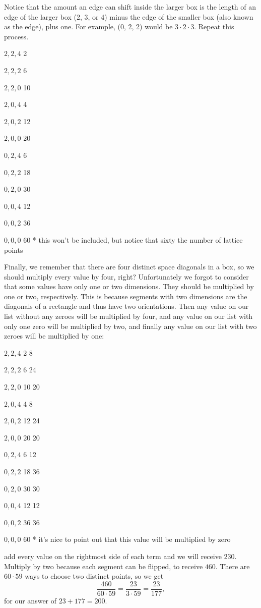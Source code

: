 \begin{enumerate}
 Notice that the amount an edge can shift inside the larger box is the length of an edge of the larger box (2, 3, or 4) minus the edge of the smaller box (also known as the edge),  plus one. For example, (0, 2, 2) would be $3 \cdot 2 \cdot 3$. Repeat this process.

 
$2,2,4$ 2

 $2,2,2$ 6

 $2,2,0$ 10

 $2,0,4$ 4 

 $2,0,2$ 12

 $2,0,0$ 20

 $0,2,4$ 6

 $0,2,2$ 18

 $0,2,0$ 30

 $0,0,4$ 12

 $0,0,2$ 36

 $0,0,0$ 60 * this won't be included, but notice that sixty the number of lattice points

 
Finally, we remember that there are four distinct space diagonals in a box, so we should multiply every value by four, right? Unfortunately we forgot to consider that some values have only one or two dimensions. They should be multiplied by one or two, respectively. This is because segments with two dimensions are the diagonals of a rectangle and thus have two orientations. Then any value on our list without any zeroes will be multiplied by four, and any value on our list with only one zero will be multiplied by two, and finally any value on our list with two zeroes will be multiplied by one:

 $2,2,4$ 2 8

 $2,2,2$ 6 24

 $2,2,0$ 10 20

 $2,0,4$ 4 8

 $2,0,2$ 12 24

 $2,0,0$ 20 20

 $0,2,4$ 6 12

 $0,2,2$ 18 36

 $0,2,0$ 30 30

 $0,0,4$ 12 12

 $0,0,2$ 36 36

 $0,0,0$ 60 * it's nice to point out that this value will be multiplied by zero

 
add every value on the rightmost side of each term and we will receive $230$. Multiply by two because each segment can be flipped, to receive $460$. There are $60 \cdot 59$ ways to choose two distinct points, so we get 
 \[\dfrac{460}{60 \cdot 59} = \dfrac{23}{3 \cdot 59} = \dfrac{23}{177},\] for our answer of $23 + 177 = \boxed{200}$.


\end{enumerate}
